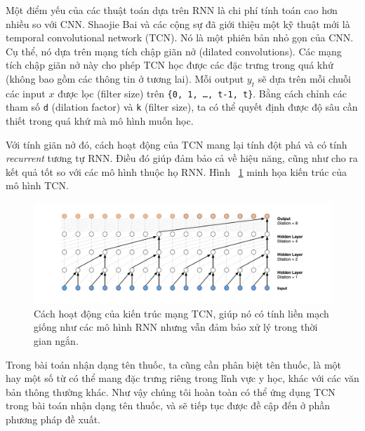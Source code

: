 Một điểm yếu của các thuật toán dựa trên RNN là chi phí tính toán cao hơn nhiều so với CNN. Shaojie Bai và các cộng sự \cite{bai2018empirical} đã giới thiệu một kỹ thuật mới là temporal convolutional network (TCN). Nó là một phiên bản nhỏ gọn của CNN. Cụ thể, nó dựa trên mạng tích chập giãn nở (dilated convolutions). Các mạng tích chập giãn nở này cho phép TCN học được các đặc trưng trong quá khứ (không bao gồm các thông tin ở tương lai). Mỗi output $y_t$ sẽ dựa trên mỗi chuỗi các input $x$ được lọc (filter size) trên \verb|{0, 1, …, t-1, t}|. Bằng cách chỉnh các tham số \verb|d| (dilation factor) và \verb|k| (filter size), ta có thể quyết định được độ sâu cần thiết trong quá khứ mà mô hình muốn học. 

Với tính giãn nở đó, cách hoạt động của TCN mang lại tính đột phá và có tính \textit{recurrent} tương tự RNN. Điều đó giúp đảm bảo cả về hiệu năng, cũng như cho ra kết quả tốt so với các mô hình thuộc họ RNN. Hình ~\ref{tcn} minh họa kiến trúc của mô hình TCN.

\begin{figure}
\centering
\includegraphics[width=1.0\textwidth]{mep_img/TCN.png}
\caption{Cách hoạt động của kiến trúc mạng TCN, giúp nó có tính liền mạch giống như các mô hình RNN nhưng vẫn đảm bảo xử lý trong thời gian ngắn.}\label{tcn}

\end{figure}

Trong bài toán nhận dạng tên thuốc, ta cũng cần phân biệt tên thuốc, là một hay một số từ có thể mang đặc trưng riêng trong lĩnh vực y học, khác với các văn bản thông thường khác. Như vậy chúng tôi hoàn toàn có thể ứng dụng TCN trong bài toán nhận dạng tên thuốc, và sẽ tiếp tục được đề cập đến ở phần phương pháp đề xuất.


